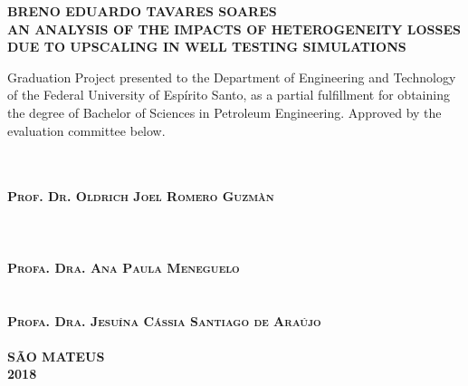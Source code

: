 \begin{titlepage}
	\center
	
	\textsc{\textbf{BRENO EDUARDO TAVARES SOARES}}\\[72pt]
	
	\textsc{\textbf{AN ANALYSIS OF THE IMPACTS OF HETEROGENEITY LOSSES DUE TO UPSCALING IN WELL TESTING SIMULATIONS}}\\[48pt]
	
	\hfill\begin{minipage}{0.5\linewidth}
		Graduation Project presented to the Department of Engineering and Technology of the Federal University of Esp\'irito Santo, as a partial fulfillment for obtaining the degree of Bachelor of Sciences in Petroleum Engineering. Approved by the evaluation committee below.
	\end{minipage}\\[48pt]
	
	\makebox[4.5in]{\hrulefill}\\
	\textsc{\textbf{Prof. Dr. Oldrich Joel Romero Guzm\`an}}\\
	\\
	\\[12pt]
	
	\makebox[4.5in]{\hrulefill}\\
	\textsc{\textbf{Profa. Dra. Ana Paula Meneguelo}}\\
	\\[12pt]
	
	\makebox[4.5in]{\hrulefill}\\
	\textsc{\textbf{Profa. Dra. Jesu\'ina C\'assia Santiago de Ara\'ujo}}\\
	\\[36pt]
	
	\textsc{\textbf{S\~AO MATEUS}}\\
	\textsc{\textbf{2018}}\\
\end{titlepage}
